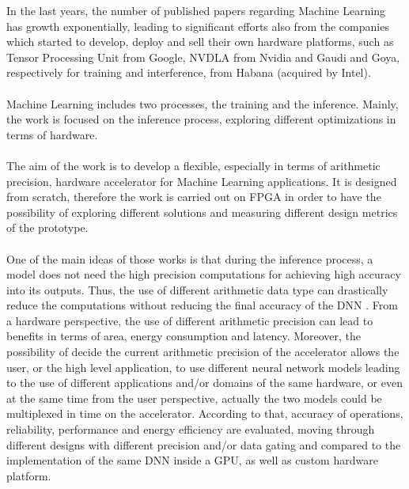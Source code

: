 In the last years, the number of published papers regarding Machine Learning has growth exponentially, leading to significant efforts also from the companies which started to develop, deploy and sell their own hardware platforms, such as Tensor Processing Unit \cite{paper:40} from Google, NVDLA\cite{WEBSITE:6} from Nvidia and Gaudi \cite{paper:39} and Goya\cite{paper:38}, respectively for training and interference, from Habana (acquired by Intel).\\\\
Machine Learning includes two processes, the training and the inference. Mainly, the work is focused on the inference process, exploring different optimizations in terms of hardware.\\\\The aim of the work is to develop a flexible, especially in terms of arithmetic precision, hardware accelerator for Machine Learning applications. It is designed from scratch, therefore the work is carried out on FPGA in order to have the possibility of exploring different solutions and measuring different design metrics of the prototype.\\\\
One of the main ideas of those works is that during the inference process, a model does not need the high precision computations \cite{paper:8} \cite{paper:15}for achieving high accuracy into its outputs. Thus, the use of different arithmetic data type can drastically reduce the computations without reducing the final accuracy of the DNN \cite{paper:7} \cite{paper:8}. From a hardware perspective,  the use of different arithmetic precision\cite{paper:14} can lead to benefits in terms of area, energy consumption and latency. Moreover, the possibility of decide the current arithmetic precision of the accelerator allows the user, or the high level application, to use different neural network models leading to the use of different  applications and/or domains of the same hardware, or even at the same time from the user perspective, actually the two models could be multiplexed in time on the accelerator.\newline
According to that, accuracy of operations, reliability, performance and energy efficiency are evaluated, moving through different designs with different precision and/or data gating and compared to the implementation of the same DNN inside a GPU, as well as custom hardware platform.

